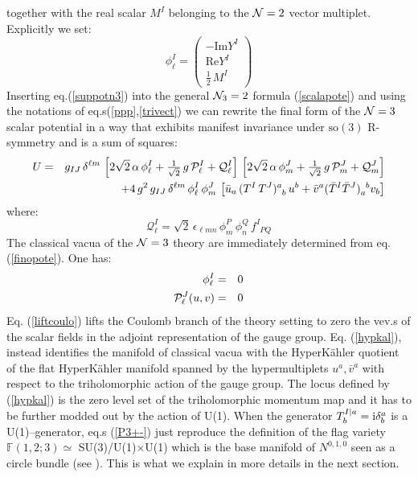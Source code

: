 \documentclass[a4paper,12pt]{article}
\newcommand{\ft}[2]{{\textstyle\frac{#1}{#2}}}
\begin{document}
together with the real scalar $M^I$ belonging to the ${\cal N}=2$
vector multiplet. Explicitly we set:
\begin{equation}
  \phi_\ell^I= \left( \begin{array}{c}
    -\mbox{Im}Y^I \\
    \mbox{Re} Y^I \\
    \ft 12 \, M^I \
  \end{array}\right)
\label{trivect}
\end{equation}
Inserting eq.(\ref{suppotn3}) into the general ${\cal N}_3=2$ formula
(\ref{scalapote}) and using
the notations of eq.s(\ref{ppp},\ref{trivect}) we can rewrite the final form
of the ${\cal N}=3$ scalar
potential in a way that exhibits manifest invariance under  $\mathrm{so(3)}$
R-symmetry and is a sum of squares:
\begin{eqnarray}
U & = & g_{IJ} \, \delta^{\ell m} \,
\left [ 2 \sqrt{2} \, \alpha \, \phi^I_\ell + \ft {1}{\sqrt{2}} \, g \,
{\cal P}^I_\ell+\mathcal{Q}^I_\ell\right]
\,
\left [ 2 \sqrt{2} \, \alpha \, \phi^J_m + \ft {1}{\sqrt{2}} \, g \, {\cal P}^J_m
+\mathcal{Q}^J_m\right]
\nonumber\\
&&+4\, g^2 \, g_{IJ} \, \delta^{\ell m} \, \phi^I_\ell \, \phi^J_m \, \left[
{\bar u}_a \, (T^I \, T^J )^{a}_{\phantom{a}b} \, u^b +
 {\bar v}^a ({\bar T}^I {\bar T}^J )_{a}^{\phantom{a}b} v_b
\right]
\label{finopote}
\end{eqnarray}
where:
\begin{equation}
  \mathcal{Q}^I_\ell=   \sqrt{2}\, \epsilon_{\ell m n} \, \phi^P_m
  \,\phi^Q_n \, f^I_{\phantom{I}PQ}
\label{giorgio}
\end{equation}
The classical vacua of the ${\cal N}=3$ theory are immediately
determined from eq.(\ref{finopote}). One has:
\begin{eqnarray}
  \phi^I_\ell &=&0   \label{liftcoulo}  \\
   {\cal P}^J_\ell (u,v) &=& 0 \label{hypkal}
\end{eqnarray}
Eq. (\ref{liftcoulo}) lifts the Coulomb branch of the
theory setting to zero the vev.s of the scalar fields in the
adjoint representation of the gauge group. Eq.
(\ref{hypkal}), instead identifies the manifold of classical vacua with the
HyperK\"ahler quotient of the flat HyperK\"ahler manifold spanned by
the hypermultiplets $u^a,\bar{v}^a$ with respect to the
triholomorphic action of the gauge group.
The locus defined by
(\ref{hypkal}) is the zero level set of the triholomorphic momentum
map and it has to be further modded out by the action of U(1).
When the generator $ T^{I\vert a}_b={\rm i} \delta^a_b$ is a
U(1)--generator, eq.s (\ref{P3+-}) just reproduce the definition
of the flag variety ${\mathbb F}(1,2;3) \simeq$ SU(3)/U(1)$\times$U(1)
which is the base manifold of $N^{0,1,0}$ seen as a circle bundle (see
\cite{3dcft}). This is what we explain in more details in the next section.
\end{document}
